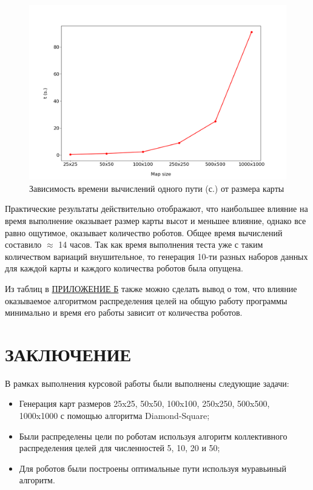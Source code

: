 \documentclass{article}
\numberwithin{equation}{section}
\begin{document}
			\begin{figure}[H]
				\centering
				\vspace{-0.5cm}
				\includegraphics[width=\textwidth]{data/path_time.png}
				\vspace{-0.5cm}
				\caption{Зависимость времени вычислений одного пути (с.) от размера карты}\label{fig:time_path}
			\end{figure}

			Практические результаты действительно отображают, что наибольшее влияние на время выполнение оказывает размер карты высот и меньшее влияние, однако все равно ощутимое, оказывает количество роботов. Общее время вычислений составило $\approx$ 14 часов. Так как время выполнения теста уже с таким количеством вариаций внушительное, то генерация 10-ти разных наборов данных для каждой карты и каждого количества роботов была опущена.

			Из таблиц в \hyperref[sec:time]{ПРИЛОЖЕНИЕ Б} также можно сделать вывод о том, что влияние оказываемое алгоритмом распределения целей на общую работу программы минимально и время его работы зависит от количества роботов.

    \newpage
	\section*{ЗАКЛЮЧЕНИЕ}

	В рамках выполнения курсовой работы были выполнены следующие задачи:
	\begin{itemize}
		\item Генерация карт размеров 25x25, 50x50, 100x100, 250x250, 500x500, 1000x1000 с помощью алгоритма Diamond-Square;
		\item Были распределены цели по роботам используя алгоритм коллективного распределения целей для численностей 5, 10, 20 и 50;
		\item Для роботов были построены оптимальные пути используя муравьиный алгоритм.
	\end{itemize}
\end{document}
